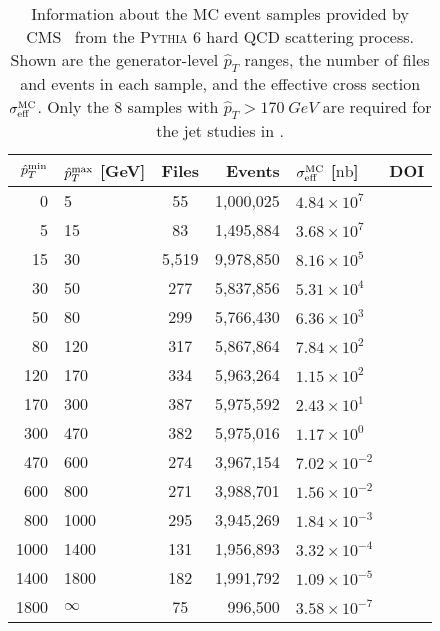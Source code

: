 \documentclass[aps,prd,twocolumn,preprintnumbers,nofootinbib,longbibliography,floatfix,superscriptaddress]{revtex4-1}
\begin{document}
\begin{table}
\begin{center}
\begin{tabular}{ r @{ -- } l c @{$\quad$} r @{$\quad$} l @{$\quad$}  c}
\hline
\hline
$\hat{p}_T^{\rm min}$ & $\hat{p}_T^{\rm max}$  [GeV] & Files &  Events  & $\sigma_{\rm eff}^\text{MC}$ [$\text{nb}$] & DOI \\
\hline\hline
0 & 5 & 55 & 1,000,025 & $4.84\times 10^7$& \cite{CMS:QCDsim0-5}\\
5 & 15 & 83 & 1,495,884 & $3.68\times 10^7$& \cite{CMS:QCDsim5-15}\\
15 & 30 & 5,519 & 9,978,850 & $8.16\times 10^5$& \cite{CMS:QCDsim15-30}\\
30 & 50 & 277 & 5,837,856 & $5.31\times 10^4$& \cite{CMS:QCDsim30-50}\\
50 & 80 & 299 & 5,766,430 & $6.36\times 10^3$& \cite{CMS:QCDsim50-80}\\
80 & 120 & 317 & 5,867,864 & $7.84\times 10^2$& \cite{CMS:QCDsim80-120}\\
120 & 170 & 334 & 5,963,264 & $1.15\times 10^2$  & \cite{CMS:QCDsim120-170}\\
\hline
170 & 300 &  387 & 5,975,592 & $2.43\times 10^{1}$ & \cite{CMS:QCDsim170-300}\\
300 & 470 & 382 & 5,975,016 & $1.17\times 10^{0}$ & \cite{CMS:QCDsim300-470}\\
470 & 600 & 274 & 3,967,154 & $7.02\times 10^{-2}$ & \cite{CMS:QCDsim470-600}\\
600 & 800 & 271 & 3,988,701 & $1.56\times 10^{-2}$ & \cite{CMS:QCDsim600-800}\\
800 & 1000 &  295 & 3,945,269 & $1.84\times 10^{-3}$ & \cite{CMS:QCDsim800-1000}\\
1000 & 1400 & 131 & 1,956,893 & $3.32\times 10^{-4}$ & \cite{CMS:QCDsim1000-1400}\\
1400 & 1800 &  182 & 1,991,792 & $1.09\times 10^{-5}$ & \cite{CMS:QCDsim1400-1800}\\
1800 & $\infty$ & 75 & 996,500 & $3.58\times 10^{-7}$ & \cite{CMS:QCDsim1800}\\
\hline
\hline
\end{tabular}
\caption{
Information about the MC event samples provided by CMS~\cite{CMS:QCDsim0-5,CMS:QCDsim5-15,CMS:QCDsim15-30,CMS:QCDsim30-50,CMS:QCDsim50-80,CMS:QCDsim80-120,CMS:QCDsim120-170,CMS:QCDsim170-300,CMS:QCDsim300-470,CMS:QCDsim470-600,CMS:QCDsim600-800,CMS:QCDsim800-1000,CMS:QCDsim1000-1400,CMS:QCDsim1400-1800,CMS:QCDsim1800} from the \textsc{Pythia} 6 hard QCD scattering process.
%
Shown are the generator-level $\hat{p}_T$ ranges, the number of files and events in each sample, and the effective cross section $\sigma^\text{MC}_{\rm eff}$.
%
Only the 8 samples with $\hat{p}_T > \SI{170}{GeV}$ are required for the jet studies in .
}
\label{table:qcd_datasets_cross_section_info}
\end{center}
\end{table}
\end{document}
